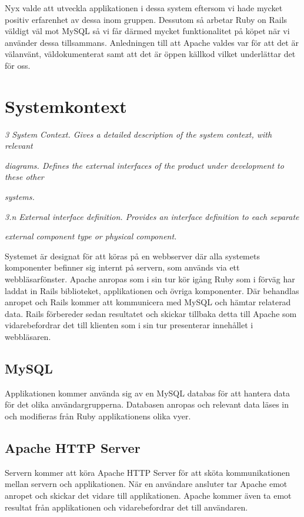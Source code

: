 \documentclass[a4paper, twoside, 11pt, titlepage]{article}
\begin{document}
Nyx valde att utveckla applikationen i dessa system eftersom vi hade mycket positiv erfarenhet av dessa inom gruppen. Dessutom så arbetar Ruby on Rails väldigt väl mot MySQL så vi får därmed mycket funktionalitet på köpet när vi använder dessa tillsammans. Anledningen till att Apache valdes var för att det är välanvänt, väldokumenterat samt att det är öppen källkod vilket underlättar det för oss.

\clearpage
\section{Systemkontext}


\emph{3 System Context. Gives a detailed description of the system context, with relevant}

\emph{diagrams. Defines the external interfaces of the product under development to these other}

\emph{systems.}

\emph{3.n External interface definition. Provides an interface definition to each separate}

\emph{external component type or physical component.}

Systemet är designat för att köras på en webbserver där alla systemets komponenter befinner sig internt  på servern, som används via ett webbläsarfönster. Apache anropas som i sin tur kör igång Ruby som i förväg har laddat in Rails biblioteket, applikationen och övriga komponenter. Där behandlas anropet och Rails kommer att kommunicera med MySQL och hämtar relaterad data. Rails förbereder sedan resultatet och skickar tillbaka detta till Apache som vidarebefordrar det till klienten som i sin tur presenterar innehållet i webbläsaren.

	\subsection{MySQL}


	Applikationen kommer använda sig av en MySQL databas för att hantera data för det olika användargrupperna. Databasen anropas och relevant data läses in och modifieras från Ruby applikationens olika vyer.

	\subsection{Apache HTTP Server}


	Servern kommer att köra Apache HTTP Server för att sköta kommunikationen mellan servern och applikationen. När en användare ansluter tar Apache emot anropet och skickar det vidare till applikationen. Apache kommer även ta emot resultat från applikationen och vidarebefordrar det till användaren.
\end{document}
